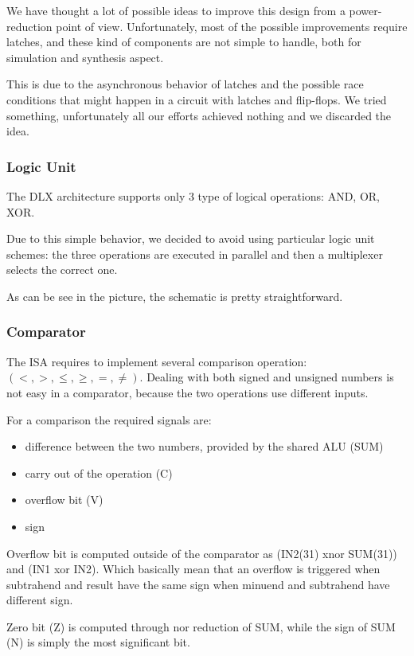 \documentclass[12pt]{article}
\begin{document}
We have thought a lot of possible ideas to improve this design from a power-reduction point of view. Unfortunately, most of the possible improvements require latches, and these kind of components are not simple to handle, both for simulation and synthesis aspect.

This is due to the asynchronous behavior of latches and the possible race conditions that might happen in a circuit with latches and flip-flops. We tried something, unfortunately all our efforts achieved nothing and we discarded the idea.

\subsubsection{Logic Unit}
The DLX architecture supports only 3 type of logical operations: AND, OR, XOR. 

Due to this simple behavior, we decided to avoid using particular logic unit schemes: the three operations are executed in parallel and then a multiplexer selects the correct one. 

As can be see in the picture, the schematic is pretty straightforward.


\subsubsection{Comparator}
The ISA requires to implement several comparison operation: $(<, >, \leq, \geq, =, \neq)$.
Dealing with both signed and unsigned numbers is not easy in a comparator, because the two operations use different inputs.

For a comparison the required signals are:
\begin{itemize}
	\item difference between the two numbers, provided by the shared ALU (SUM)
	\item carry out of the operation (C)
	\item overflow bit (V)
	\item sign
\end{itemize}
Overflow bit is computed outside of the comparator as (IN2(31) xnor SUM(31)) and (IN1 xor IN2).
Which basically mean that an overflow is triggered when subtrahend and result have the same sign when minuend and subtrahend have different sign.

Zero bit (Z) is computed through nor reduction of SUM, while the sign of SUM (N) is simply the most significant bit.
\end{document}
